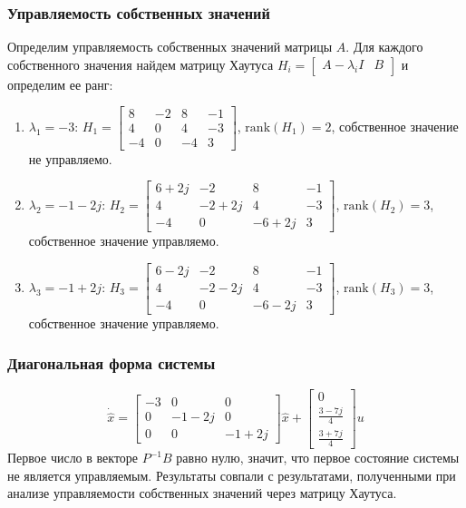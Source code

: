 \subsubsection{Управляемость собственных значений}
Определим управляемость собственных значений матрицы $A$. Для каждого собственного значения найдем матрицу Хаутуса $H_i = \begin{bmatrix} A - \lambda_i I & B \end{bmatrix}$ и определим ее ранг:
\begin{enumerate}
    \item $\lambda_1 = -3$: $H_1 = \begin{bmatrix}
        8 & -2 & 8 & -1\\
        4 & 0 & 4 & -3 \\
        -4 & 0 & -4 & 3
    \end{bmatrix}$, $\text{rank}(H_1) = 2$, собственное значение не управляемо.
    \item $\lambda_2 = -1-2j$: $H_2 = \begin{bmatrix}
        6+2j & -2 & 8 & -1\\
        4 & -2+2j & 4 & -3 \\
        -4 & 0 & -6+2j & 3
    \end{bmatrix}$, $\text{rank}(H_2) = 3$, собственное значение управляемо.
    \item $\lambda_3 = -1+2j$: $H_3 = \begin{bmatrix}
        6-2j & -2 & 8 & -1\\
        4 & -2-2j & 4 & -3 \\
        -4 & 0 & -6-2j & 3
    \end{bmatrix}$, $\text{rank}(H_3) = 3$, собственное значение управляемо.
\end{enumerate}

\subsubsection{Диагональная форма системы}
\begin{equation}
    \dot{\hat{x}} = \begin{bmatrix}
        -3 & 0 & 0 \\
        0 & -1-2j & 0 \\
        0 & 0 & -1+2j
    \end{bmatrix} \hat{x} + 
    \begin{bmatrix}
        0 \\
        \frac{3 - 7j}{4} \\ 
        \frac{3 + 7j}{4}
    \end{bmatrix} u
\end{equation}
Первое число в векторе $P^{-1}B$ равно нулю, значит, что первое состояние системы не является управляемым. 
Результаты совпали с результатами, полученными при анализе управляемости собственных значений через матрицу Хаутуса.

